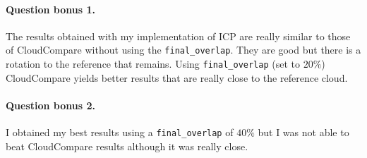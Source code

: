 \documentclass[french]{article}
\begin{document}
\paragraph{Question bonus 1.}
The results obtained with my implementation of ICP are really similar to those of CloudCompare without using the \texttt{final\_overlap}. They are good but there is a rotation to the reference that remains. Using \texttt{final\_overlap} (set to $20\%$) CloudCompare yields better results that are really close to the reference cloud.

\paragraph{Question bonus 2.}
I obtained my best results using a \texttt{final\_overlap} of $40\%$ but I was not able to beat CloudCompare results although it was really close.
\end{document}

